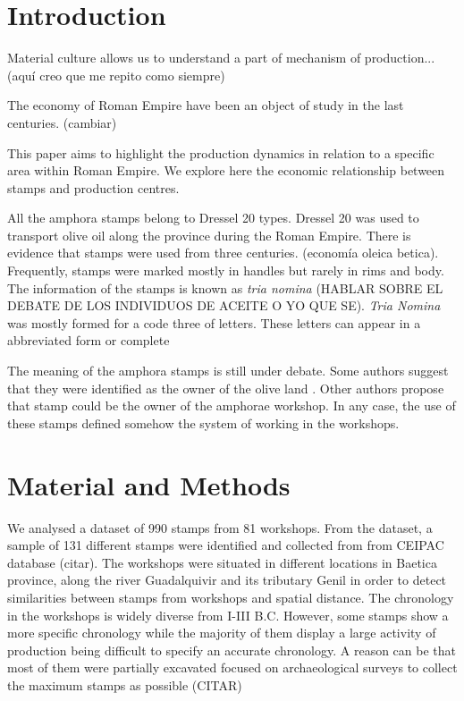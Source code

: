 \documentclass[review]{elsarticle}
\begin{document}
\section{Introduction}


Material culture allows us to understand a part of mechanism of production... (aquí creo que me repito como siempre)


The economy of Roman Empire have been an object of study in the last centuries. (cambiar)

This paper aims to highlight the production dynamics in relation to a specific area within Roman Empire. We explore here the economic relationship between stamps and production centres.  



All the amphora stamps belong to Dressel 20 types. Dressel 20 was used to transport olive oil along the province during the Roman Empire. There is evidence that stamps were used from three centuries. (economía oleica betica). Frequently, stamps were marked mostly in handles but rarely in rims and body.  
The information of the stamps is known as \textit{tria nomina} (HABLAR SOBRE EL DEBATE DE LOS INDIVIDUOS DE ACEITE O YO QUE SE). \textit{Tria Nomina} was mostly formed for a code three of letters. These letters can appear in a abbreviated form or complete \citep{berni_millet_amphora_1996}

The meaning of the amphora stamps is still under debate. Some authors suggest that they were identified as the owner of the olive land \citep{rodriguez_economioleicola_1977}. Other authors propose that stamp could be the owner of the amphorae workshop. In any case, the use of these stamps defined somehow the system of working in the workshops. 

\section{Material and Methods}

We analysed a dataset of 990 stamps from 81 workshops. From the dataset, a sample of 131 different stamps were identified and collected from from CEIPAC database (citar). The workshops were situated in different locations in Baetica province, along the river Guadalquivir and its tributary Genil in order to detect similarities between stamps from workshops and spatial distance. The chronology in the workshops is widely diverse from I-III B.C. However, some stamps show a more specific chronology while the majority of them display a large activity of production being difficult to specify an accurate chronology. A reason can be that most of them were partially excavated focused on archaeological surveys to collect the maximum stamps as possible (CITAR) 
\end{document}
